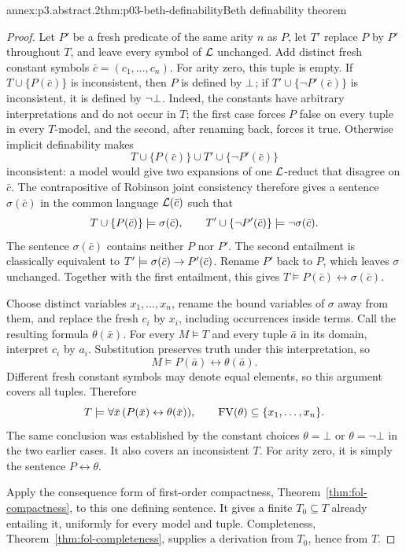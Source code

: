 \begin{annexitem}{annex:p3.abstract.2}{thm:p03-beth-definability}{Beth definability theorem}
\begin{proof}
Let \(P'\) be a fresh predicate of the same arity \(n\) as \(P\), let
\(T'\) replace \(P\) by \(P'\) throughout \(T\), and leave every
symbol of \(\mathcal{L}\) unchanged.
Add distinct fresh constant symbols \(\bar c=(c_1,\ldots,c_n)\).
For arity zero, this tuple is empty.  If
\(T\cup\{P(\bar c)\}\) is inconsistent, then \(P\) is defined by
\(\bot\); if \(T'\cup\{\neg P'(\bar c)\}\) is inconsistent, it is
defined by \(\neg\bot\).
Indeed, the constants have arbitrary interpretations and do not occur
in \(T\); the first case forces \(P\) false on every tuple in every
\(T\)-model, and the second, after renaming back, forces it true.
Otherwise implicit definability makes
\[
 T\cup\{P(\bar c)\}\cup
 T'\cup\{\neg P'(\bar c)\}
\]
inconsistent: a model would give two expansions of one \(\mathcal{L}\)-reduct that
disagree on \(\bar c\).  The contrapositive of Robinson joint consistency
therefore gives a sentence \(\sigma(\bar c)\) in the common language
\(\mathcal{L}(\bar c)\) such that
\[
 T\cup\{P(\bar c)\}\models\sigma(\bar c),
 \qquad
 T'\cup\{\neg P'(\bar c)\}\models\neg\sigma(\bar c).
\]
The sentence \(\sigma(\bar c)\) contains neither \(P\) nor \(P'\).
The second entailment is classically equivalent to
\(T'\models\sigma(\bar c)\to P'(\bar c)\).  Rename \(P'\) back to \(P\),
which leaves \(\sigma\) unchanged.  Together with the first entailment,
this gives \(T\models P(\bar c)\leftrightarrow\sigma(\bar c)\).

Choose distinct variables \(x_1,\ldots,x_n\), rename the bound variables
of \(\sigma\) away from them, and replace the fresh \(c_i\) by \(x_i\),
including occurrences inside terms.  Call the resulting formula
\(\theta(\bar x)\).
For every \(M\models T\) and every tuple \(\bar a\) in its domain,
interpret \(c_i\) by \(a_i\).  Substitution preserves truth under
this interpretation, so
\[
 M\models P(\bar a)\leftrightarrow\theta(\bar a).
\]
Different fresh constant symbols may denote equal elements, so this
argument covers all tuples.
Therefore
\[
 T\models\forall\bar x\,
                (P(\bar x)\leftrightarrow\theta(\bar x)),
 \qquad \operatorname{FV}(\theta)\subseteq\{x_1,\ldots,x_n\}.
\]
The same conclusion was established by the constant choices
\(\theta=\bot\) or \(\theta=\neg\bot\) in the two earlier cases.
It also covers an inconsistent \(T\).
For arity zero, it is simply the sentence \(P\leftrightarrow\theta\).

Apply the consequence form of first-order compactness,
Theorem~\ref{thm:fol-compactness}, to this one defining sentence.
It gives a finite \(T_0\subseteq T\) already entailing it, uniformly
for every model and tuple.
Completeness, Theorem~\ref{thm:fol-completeness}, supplies a derivation
from \(T_0\), hence from \(T\).
\end{proof}
\end{annexitem}

